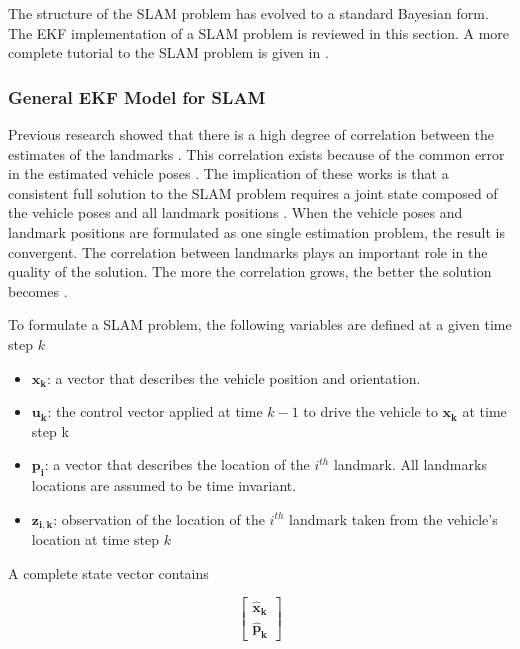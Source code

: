 The structure of the SLAM problem has evolved to a standard
Bayesian form. The EKF implementation of a SLAM problem is reviewed in
this section. A more complete tutorial to the SLAM problem is given in
\cite{durrant-whyte_simultaneous_2006}
\cite{bailey_simultaneous_2006}.

\subsubsection{General EKF Model for SLAM}
Previous research showed that there is a high degree of correlation
between the estimates of the landmarks
\cite{smith_representation_1986} \cite{durrant-whyte_uncertain_1988}.
This correlation exists because of the common error in the estimated
vehicle poses \cite{leonard_simultaneous_1991}. The implication of
these works is that a consistent full solution to the SLAM problem
requires a joint state composed of the vehicle poses and all landmark
positions \cite{durrant-whyte_simultaneous_2006}. When the vehicle
poses and landmark positions are formulated as one single estimation
problem, the result is convergent. The correlation between landmarks
plays an important role in the quality of the solution. The more the
correlation grows, the better the solution becomes
\cite{durrant-whyte_localization_1996} \cite{csorba_new_1996}
\cite{csorba_simultaneous_1997} \cite{dissanayake_solution_2001}.

To formulate a SLAM problem, the following variables are defined at a given time step $k$
\begin{itemize}
  \item $\boldsymbol{x_k}$: a vector that describes the vehicle position and
orientation.
  \item $\boldsymbol{u_k}$: the control vector applied at time $k-1$ to drive the
vehicle to $\boldsymbol{x_k}$ at time step k
  \item $\boldsymbol{p_i}$: a vector that describes the location of the $i^{th}$
landmark. All landmarks locations are assumed to be time invariant.
  \item $\boldsymbol{z_{i,k}}$: observation of the location of the $i^{th}$
landmark taken from the vehicle's location at time step $k$
\end{itemize}

\noindent A complete state vector contains 

\begin{equation}\begin{bmatrix}\boldsymbol{\hat{x}_k} \\ \boldsymbol{\hat{p}_k} \end{bmatrix}\end{equation}

